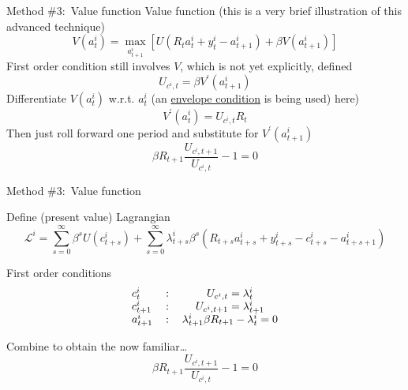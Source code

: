 
\begin{frame}{Method \#3:\ Value function}
Value function (this is a very brief illustration of this advanced technique)
\begin{equation*}
V(a_{t}^{i})=\underset{a_{t+1}^{i}}{\max }\left[U(R_{t}a_{t}^{i}+y_{t}^{i}-a_{t+1}^{i})+\beta V(a_{t+1}^{i})\right]
\end{equation*}
First order condition still involves $V$, which is not yet explicitly, defined
\begin{equation*}
U_{c^{i},t}=\beta V^{\prime }(a_{t+1}^{i})
\end{equation*}
Differentiate $V(a_{t}^{i})$ w.r.t. $a_{t}^{i}$ (an \href{https://en.wikipedia.org/wiki/Envelope_theorem}{envelope condition} is being used) here)
\begin{equation*}
V^{\prime }(a_{t}^{i})=U_{c^{i},t}R_{t}
\end{equation*}
Then just roll forward one period and substitute for $V^{\prime }(a_{t+1}^{i})$
\begin{equation*}
\beta R_{t+1}\frac{U_{c^{i},t+1}}{U_{c^{i},t}}-1=0
\end{equation*}
\end{frame}


\begin{frame}{Method \#3:\ Value function}

Define (present value) Lagrangian
\begin{equation*}
\mathcal{L}^{i}=\underset{s=0}{\overset{\infty }{\sum }}\beta^{s}U(c_{t+s}^{i})+\underset{s=0}{\overset{\infty }{\sum }}\lambda_{t+s}^{i}\beta ^{s}\left(R_{t+s}a_{t+s}^{i}+y_{t+s}^{i}-c_{t+s}^{i}-a_{t+s+1}^{i}\right)
\end{equation*}

First order conditions 
\begin{equation*}
\begin{tabular}{llc}
$c_{t}^{i}$ & : & $U_{c^{i},t}=\lambda _{t}^{i}$ \\ 
$c_{t+1}^{i}$ & : & $U_{c^{i},t+1}=\lambda _{t+1}^{i}$ \\ 
$a_{t+1}^{i}$ & : & $\lambda_{t+1}^{i}\beta R_{t+1}-\lambda_{t}^{i}=0$
\end{tabular}
\end{equation*}

Combine to obtain the now familiar\ldots
\begin{equation*}
\beta R_{t+1}\frac{U_{c^{i},t+1}}{U_{c^{i},t}}-1=0
\end{equation*}
\end{frame}

